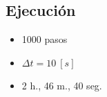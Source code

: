 \documentclass[spanish]{beamer}
\begin{document}
\subsection{Ejecución}
\begin{frame}
\begin{itemize}
\item 1000 pasos
\item $\Delta t=10~[s]$
\item 2 h., 46 m., 40 seg.
\end{itemize}
\end{frame}
%
\end{document}
